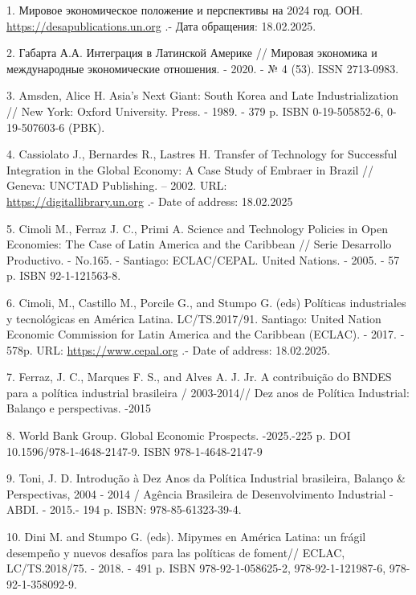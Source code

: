 \begin{references}
1. Мировое экономическое положение и перспективы на 2024 год. ООН.
\href{https://desapublications.un.org/sites/default/files/publications/2024-03/WESP\%202024_Executive\%20Summary_Russian_0.pdf}{https://desapublications.un.org}
.- Дата обращения: 18.02.2025.

2. Габарта А.А. Интеграция в Латинской Америке // Мировая экономика и
международные экономические отношения. - 2020. - № 4 (53). ISSN
2713-0983.

3. Amsden, Alice H. Asia's Next Giant: South Korea and Late
Industrialization // New York: Oxford University. Press. - 1989. - 379
p. ISBN 0-19-505852-6, 0-19-507603-6 (PBK).

4. Cassiolato J., Bernardes R., Lastres H. Transfer of Technology for
Successful Integration in the Global Economy: A Case Study of Embraer in
Brazil // Geneva: UNCTAD Publishing. -- 2002. URL:\\
\href{https://digitallibrary.un.org/record/479842?v=pdf}{https://digitallibrary.un.org} .- Date of
address: 18.02.2025

5. Cimoli M., Ferraz J. C., Primi A. Science and Technology Policies in
Open Economies: The Case of Latin America and the Caribbean // Serie
Desarrollo Productivo. - No.165. - Santiago: ECLAC/CEPAL. United
Nations. - 2005. - 57 p. ISBN 92-1-121563-8.

6. Cimoli, M., Castillo M., Porcile G., and Stumpo G. (eds) Políticas
industriales y tecnológicas en América Latina. LC/TS.2017/91. Santiago:
United Nation Economic Commission for Latin America and the Carib\-bean
(ECLAC). - 2017. - 578p. URL:
\href{https://www.cepal.org/es/publicaciones/42363-politicasindustriales-tecnologicas-america-latina}{https://www.cepal.org} .-
Date of address: 18.02.2025.

7. Ferraz, J. C., Marques F. S., and Alves A. J. Jr. A contribuição do
BNDES para a política industrial brasileira / 2003-2014// Dez anos de
Política Industrial: Balanço e perspectivas. -2015

8. World Bank Group. Global Economic Prospects. -2025.-225 p. DOI
10.1596/978-1-4648-2147-9. ISBN 978-1-4648-2147-9

9. Toni, J. D. Introdução à Dez Anos da Política Industrial brasileira,
Balanço \& Perspectivas, 2004 - 2014 / Agência Brasileira de
Desenvolvimento Industrial - ABDI. - 2015.- 194 p. ISBN:
978-85-61323-39-4.

10. Dini M. and Stumpo G. (eds). Mipymes en América Latina: un frágil
desempeño y nuevos desafíos para las políticas de foment// ECLAC,
LC/TS.2018/75. - 2018. - 491 p. ISBN 978-92-1-058625-2,
978-92-1-121987-6, 978-92-1-358092-9.


\end{references}
